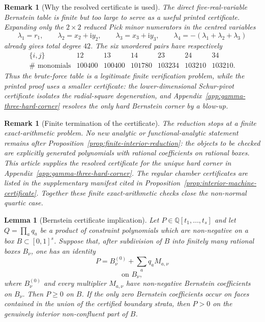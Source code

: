 \documentclass[11pt]{article}
\newtheorem{lemma}[theorem]{Lemma}
\newtheorem{remark}[theorem]{Remark}
\numberwithin{equation}{section}
\newcommand{\bbQ}{\mathbb Q}
\newcommand{\ii}{\mathrm i}
\begin{document}
\begin{remark}[Why the resolved certificate is used]\label{rem:direct-bernstein-size}
The direct five-real-variable Bernstein table is finite but too large to serve
as a useful printed certificate.  Expanding only the \(2\times2\) reduced Pick
minor numerators in the centred variables
\[
  \lambda_1=r_1,\qquad \lambda_2=x_2+\ii y_2,\qquad
  \lambda_3=x_3+\ii y_3,\qquad
  \lambda_4=-(\lambda_1+\lambda_2+\lambda_3)
\]
already gives total degree \(42\).  The six unordered pairs have respectively
\[
\begin{array}{c|cccccc}
\{i,j\}&12&13&14&23&24&34\\ \hline
\#\text{ monomials}&100400&100400&101780&103234&103210&103210 .
\end{array}
\]
Thus the brute-force table is a legitimate finite verification problem, while
the printed proof uses a smaller certificate: the lower-dimensional
Schur-pivot certificate isolates the radial-square degeneration, and
Appendix~\ref{app:gamma-three-hard-corner} resolves the only hard Bernstein
corner by a blow-up.
\end{remark}

\begin{remark}[Finite termination of the certificate]\label{rem:finite-certificate-termination}
The reduction stops at a finite exact-arithmetic problem.  No new analytic or
functional-analytic statement remains after
Proposition~\ref{prop:finite-interior-reduction}: the objects to be checked are
explicitly generated polynomials with rational coefficients on rational boxes.
This article supplies the resolved certificate for the unique hard corner in
Appendix~\ref{app:gamma-three-hard-corner}.  The regular chamber certificates
are listed in the supplementary manifest cited in
Proposition~\ref{prop:interior-machine-certificate}.  Together these finite
exact-arithmetic checks close the non-normal quartic case.
\end{remark}

\begin{lemma}[Bernstein certificate implication]\label{lem:bernstein-certificate-implication}
Let \(P\in\bbQ[t_1,\ldots,t_s]\) and let \(Q=\prod_a q_a\) be a product of
constraint polynomials which are non-negative on a box \(B\subset[0,1]^s\).
Suppose that, after subdivision of \(B\) into finitely many rational boxes
\(B_\nu\), one has an identity
\[
  P=B_\nu^{(0)}+\sum_a q_a M_{a,\nu}
\]
\[
  \text{on }B_\nu,
\]
where \(B_\nu^{(0)}\) and every multiplier \(M_{a,\nu}\) have non-negative
Bernstein coefficients on \(B_\nu\).
Then \(P\ge0\) on \(B\).  If the only zero Bernstein coefficients occur on
faces contained in the union of the certified boundary strata, then \(P>0\) on
the genuinely interior non-confluent part of \(B\).
\end{lemma}
\end{document}
